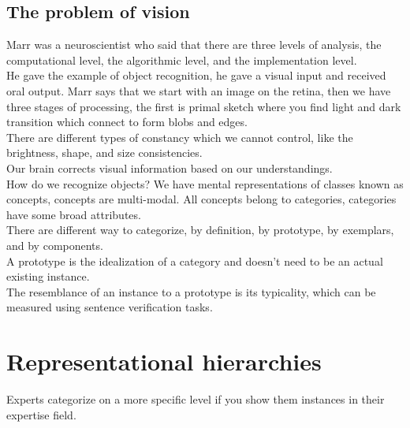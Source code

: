 \documentclass[11pt]{article}
\begin{document}
	\subsection{The problem of vision}
	Marr was a neuroscientist who said that there are three levels of analysis, the computational level, the algorithmic level, and the implementation level.\\
	He gave the example of object recognition, he gave a visual input and received oral output. Marr says that we start with an image on the retina, then we have three stages of processing, the first is primal sketch where you find light and dark transition which connect to form blobs and edges.\\
	There are different types of constancy which we cannot control, like the brightness, shape, and size consistencies.\\
	Our brain corrects visual information based on our understandings.\\
	How do we recognize objects? We have mental representations of classes known as concepts, concepts are multi-modal. All concepts belong to categories, categories have some broad attributes.\\
	There are different way to categorize, by definition, by prototype, by exemplars, and by components.\\
	A prototype is the idealization of a category and doesn't need to be an actual existing instance.\\
	The resemblance of an instance to a prototype is its typicality, which can be measured using sentence verification tasks.\\
	
	\section{Representational hierarchies}
	Experts categorize on a more specific level if you show them instances in their expertise field.\\
	
\end{document}
